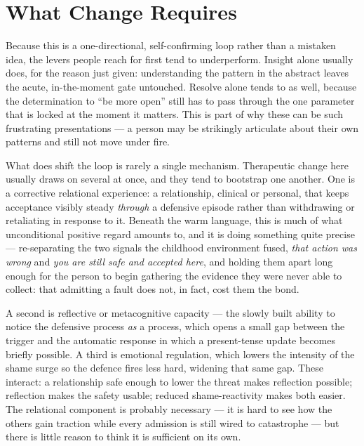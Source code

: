 \documentclass{article}
\begin{document}
\section*{What Change Requires}

Because this is a one-directional, self-confirming loop rather than a mistaken idea, the levers people reach for first tend to underperform. Insight alone usually does, for the reason just given: understanding the pattern in the abstract leaves the acute, in-the-moment gate untouched. Resolve alone tends to as well, because the determination to \enquote{be more open} still has to pass through the one parameter that is locked at the moment it matters. This is part of why these can be such frustrating presentations --- a person may be strikingly articulate about their own patterns and still not move under fire.

What does shift the loop is rarely a single mechanism. Therapeutic change here usually draws on several at once, and they tend to bootstrap one another. One is a corrective relational experience: a relationship, clinical or personal, that keeps acceptance visibly steady \textit{through} a defensive episode rather than withdrawing or retaliating in response to it. Beneath the warm language, this is much of what unconditional positive regard amounts to, and it is doing something quite precise --- re-separating the two signals the childhood environment fused, \textit{that action was wrong} and \textit{you are still safe and accepted here}, and holding them apart long enough for the person to begin gathering the evidence they were never able to collect: that admitting a fault does not, in fact, cost them the bond.

A second is reflective or metacognitive capacity --- the slowly built ability to notice the defensive process \textit{as} a process, which opens a small gap between the trigger and the automatic response in which a present-tense update becomes briefly possible. A third is emotional regulation, which lowers the intensity of the shame surge so the defence fires less hard, widening that same gap. These interact: a relationship safe enough to lower the threat makes reflection possible; reflection makes the safety usable; reduced shame-reactivity makes both easier. The relational component is probably necessary --- it is hard to see how the others gain traction while every admission is still wired to catastrophe --- but there is little reason to think it is sufficient on its own.
\end{document}
